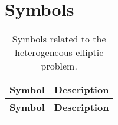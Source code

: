 \pagestyle{empty}

\section*{Symbols}
\begin{longtable}{c p{10cm}}
    \caption{Symbols related to the heterogeneous elliptic problem.}\label{tab:elliptic_symbols}                     \\
    \hline
    \textbf{Symbol}        & \textbf{Description}                                                                    \\
    \hline
    \endfirsthead

    \hline
    \textbf{Symbol}        & \textbf{Description}                                                                    \\
    \hline
    \endhead

    \hline
    \endfoot

    \hline
    \endlastfoot


\end{longtable}
